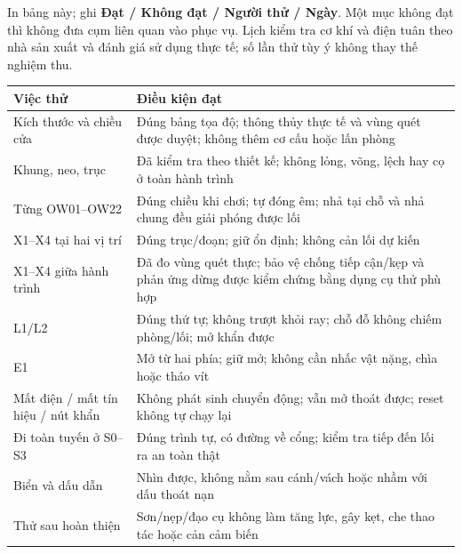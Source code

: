 \documentclass[
  11pt,
  a4paper,
]{article}
\newcounter{none} %
\begin{document}
In bảng này; ghi \textbf{Đạt / Không đạt / Người thử / Ngày}. Một mục
không đạt thì không đưa cụm liên quan vào phục vụ. Lịch kiểm tra cơ khí
và điện tuân theo nhà sản xuất và đánh giá sử dụng thực tế; số lần thử
tùy ý không thay thế nghiệm thu.

{\def\LTcaptype{none} %
\begin{longtable}[]{@{}
  >{\raggedright\arraybackslash}p{}
  >{\raggedright\arraybackslash}p{}@{}}
\toprule\noalign{}
\begin{minipage}[b]{\linewidth}\raggedright
Việc thử
\end{minipage} & \begin{minipage}[b]{\linewidth}\raggedright
Điều kiện đạt
\end{minipage} \\
\midrule\noalign{}
\endhead
\bottomrule\noalign{}
\endlastfoot
Kích thước và chiều cửa & Đúng bảng tọa độ; thông thủy thực tế và vùng
quét được duyệt; không thêm cơ cấu hoặc lấn phòng \\
Khung, neo, trục & Đã kiểm tra theo thiết kế; không lỏng, võng, lệch hay
cọ ở toàn hành trình \\
Từng OW01--OW22 & Đúng chiều khi chơi; tự đóng êm; nhả tại chỗ và nhả
chung đều giải phóng được lối \\
X1--X4 tại hai vị trí & Đúng trục/đoạn; giữ ổn định; không cản lối dự
kiến \\
X1--X4 giữa hành trình & Đã đo vùng quét thực; bảo vệ chống tiếp cận/kẹp
và phản ứng dừng được kiểm chứng bằng dụng cụ thử phù hợp \\
L1/L2 & Đúng thứ tự; không trượt khỏi ray; chỗ đỗ không chiếm phòng/lối;
mở khẩn được \\
E1 & Mở từ hai phía; giữ mở; không cần nhấc vật nặng, chìa hoặc tháo
vít \\
Mất điện / mất tín hiệu / nút khẩn & Không phát sinh chuyển động; vẫn mở
thoát được; reset không tự chạy lại \\
Đi toàn tuyến ở S0--S3 & Đúng trình tự, có đường về cổng; kiểm tra tiếp
đến lối ra an toàn thật \\
Biển và dấu dẫn & Nhìn được, không nằm sau cánh/vách hoặc nhầm với dấu
thoát nạn \\
Thử sau hoàn thiện & Sơn/nẹp/đạo cụ không làm tăng lực, gây kẹt, che
thao tác hoặc cản cảm biến \\
\end{longtable}
}
\end{document}
